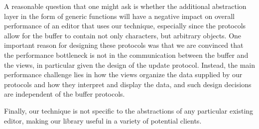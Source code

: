 A reasonable question that one might ask is whether the additional
abstraction layer in the form of generic functions will have a
negative impact on overall performance of an editor that uses our
technique, especially since the protocols allow for the buffer to
contain not only characters, but arbitrary objects.  One important
reason for designing these protocols was that we are convinced that
the performance bottleneck is not in the communication between the
buffer and the views, in particular given the design of the update
protocol.  Instead, the main performance challenge lies in how the
views organize the data supplied by our protocols and how they
interpret and display the data, and such design decisions are
independent of the buffer protocols.

Finally, our technique is not specific to the abstractions of any
particular existing editor, making our library useful in a variety of
potential clients.
